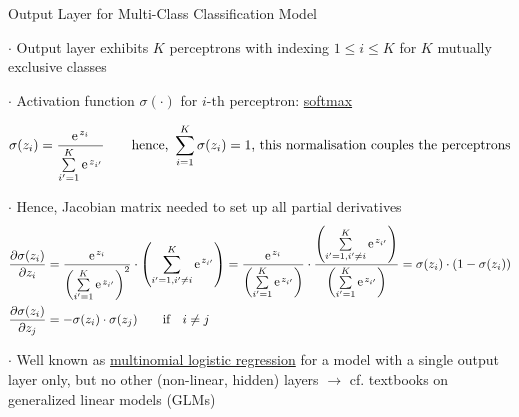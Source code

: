 \documentclass[mathserif, aspectratio=1610]{intbeamer}
\begin{document}
\begin{frame}[t]{Output Layer for Multi-Class Classification Model}

$\cdot$ Output layer exhibits $K$ perceptrons with indexing $1 \leq i \leq K$ for $K$ mutually exclusive classes

$\cdot$ Activation function $\sigma(\cdot)$ for $i\text{-th}$ perceptron: \underline{softmax}

$$
\sigma(z_i) = \frac{\e^{z_i}}{\sum\limits_{i'=1}^{K} \e^{z_{i'}}} \qquad \text{hence, }\sum\limits_{i=1}^{K} \sigma(z_i) = 1
\text{, this normalisation couples the perceptrons}
$$

$\cdot$ Hence, Jacobian matrix needed to set up all partial derivatives
\begin{align*}
&\frac{\partial \sigma(z_i)}{\partial z_i} = \frac{\e^{z_i}}{\left(\sum\limits_{i'=1}^{K} \e^{z_{i'}}\right)^2} \cdot \left(\sum\limits_{i'=1, i' \neq i}^{K} \e^{z_{i'}}\right)=
\frac{\e^{z_i}}{\left(\sum\limits_{i'=1}^{K} \e^{z_{i'}}\right)} \cdot
\frac{\left(\sum\limits_{i'=1, i' \neq i}^{K} \e^{z_{i'}}\right)}{\left(\sum\limits_{i'=1}^{K} \e^{z_{i'}}\right)}=
\sigma(z_i) \cdot(1-\sigma(z_i))
\\
&\frac{\partial \sigma(z_i)}{\partial z_j} = - \sigma(z_i) \cdot \sigma(z_j)\qquad \text{if} \quad i \neq j
\end{align*}

%

$\cdot$ Well known as \underline{multinomial logistic regression} for a model with a single output layer only, but no other (non-linear, hidden) layers $\rightarrow$ cf. textbooks on generalized linear models (GLMs)


\end{frame}
\end{document}
